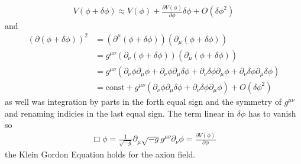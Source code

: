 \documentclass[a4paper]{article}
\begin{document}
\begin{align*}
    V(\phi + \delta \phi) \approx V(\phi) + \frac{\partial V(\phi)}{\partial \phi} \delta \phi + O(\delta \phi^2)
\end{align*}
and
\begin{align*}
      (\partial (\phi + \delta \phi))^2 &= (\partial^\mu (\phi + \delta \phi)) (\partial_\mu (\phi + \delta \phi)) \\
                                        &= g^{\mu \nu} (\partial_\nu (\phi + \delta \phi)) (\partial_\mu (\phi + \delta \phi)) \\
                                        &= g^{\mu \nu} (\partial_\nu \phi \partial_\mu \phi + \partial_\nu \phi \partial_\mu \delta \phi +
                                                        \partial_\nu \delta \phi \partial_\mu \phi + \partial_\nu \delta \phi \partial_\mu \delta \phi) \\
                                        &= \mathrm{const} + g^{\mu \nu} (\partial_\nu \phi \partial_\mu \delta \phi + \partial_\nu \delta \phi \partial_\mu \phi) + O(\delta \phi ^2)
\end{align*}
as well was integration by parts in the forth equal sign and the symmetry of $g^{\mu \nu}$ and renaming indicies in the last
equal sign.
The term linear in $\delta \phi$ has to vanish so
\begin{align}
    \label{eq:klein_gordon}
    \Box \phi = \frac{1}{\sqrt{-g}} \partial_\mu \sqrt{-g} g^{\mu \nu} \partial_\nu \phi = \frac{\partial V(\phi)}{\partial \phi}
\end{align}
the Klein Gordon Equation holds for the axion field. \cite[Chap. 4.1, Page 26]{MarshAxionCosmo}
\end{document}
